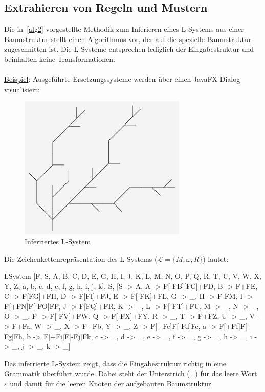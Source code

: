\subsection*{Extrahieren von Regeln und Mustern}
Die in~\ref{alg2} vorgestellte Methodik zum Inferieren eines L-Systems aus einer Baumstruktur
stellt einen Algorithmus vor, der auf die spezielle Baumstruktur zugeschnitten ist.
Die L-Systeme entsprechen lediglich der Eingabestruktur und beinhalten keine Transformationen.\\~\\
\underline{Beispiel}: Ausgeführte Ersetzungssysteme werden über einen JavaFX Dialog visualisiert:
\begin{figure}[H]
    \centering
    \includegraphics[width=8cm]{../images/evaluierung_inferrieren_lsystem.png}
    \caption{Inferriertes L-System}
\end{figure}
Die Zeichenkettenrepräsentation des L-Systems ($\mathcal{L}=\{M,\omega,R\}$) lautet:
\begin{csource}
LSystem{
    [F, S, A, B, C, D, E, G, H, I, J, K, L, M, N, O, P, Q, R, T, U, V, W, X, Y, Z, a, b, c, d, e, f, g, h, i, j, k],
    S,
    [S -> A, A -> F[-FB][FC]+FD, B -> F+FE, C -> F[FG]+FH, D -> F[FI]+FJ, E -> F[-FK]+FL, G -> _, H -> F-FM, I -> F[+FN]F[-FO]FP, J -> F[FQ]+FR, K -> _, L -> F[-FT]+FU, M -> _, N -> _, O -> _, P -> F[-FV]+FW, Q -> F[-FX]+FY, R -> _, T -> F+FZ, U -> _, V -> F+Fa, W -> _, X -> F+Fb, Y -> _, Z -> F[+Fc]F[-Fd]Fe, a -> F[+Ff]F[-Fg]Fh, b -> F[+Fi]F[-Fj]Fk, c -> _, d -> _, e -> _, f -> _, g -> _, h -> _, i -> _, j -> _, k -> _]
}
\end{csource}

Das inferrierte L-System zeigt, dass die Eingabestruktur richtig in eine Grammatik überführt wurde.
Dabei steht der Unterstrich (\_) für das leere Wort $\varepsilon$ und damit für die leeren Knoten
der aufgebauten Baumstruktur.

